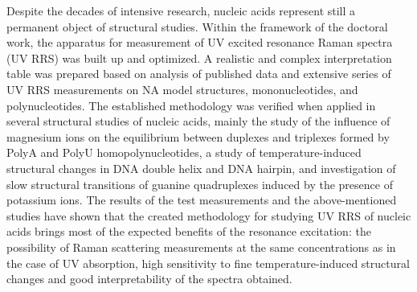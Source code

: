 \documentclass[12pt]{report}
\begin{document}

Despite the decades of intensive research, nucleic acids represent still a
permanent object of structural studies.
Within the framework of the doctoral work, the apparatus for measurement of UV
excited resonance Raman spectra (UV RRS) was built up and optimized.
A realistic and complex interpretation table was prepared based on analysis of
published data and extensive series of UV RRS measurements on NA model
structures, mononucleotides, and polynucleotides.
The established methodology was verified when applied in several structural
studies of nucleic acids, mainly the study of the influence of magnesium ions
on the equilibrium between duplexes and triplexes formed by PolyA and PolyU
homopolynucleotides, a study of temperature-induced structural changes in
DNA double helix and DNA hairpin, and investigation of slow structural
transitions of guanine quadruplexes induced by the presence of potassium ions.
The results of the test measurements and the above-mentioned studies have shown
that the created methodology for studying UV RRS of nucleic acids brings most
of the expected benefits of the resonance excitation: the possibility of Raman
scattering measurements at the same concentrations as in the case of UV
absorption, high sensitivity to fine temperature-induced structural changes
and good interpretability of the spectra obtained.
\end{document}

